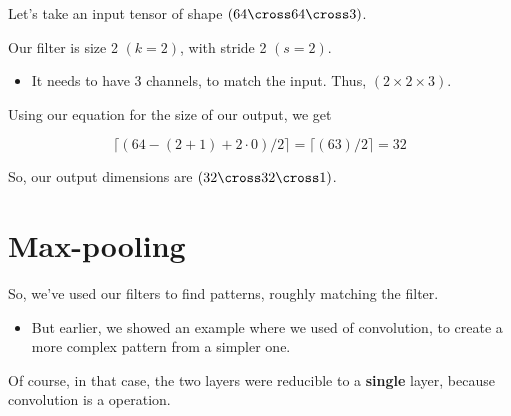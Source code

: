         \miniex Let's take an input tensor of shape $(64 \cross 64 \cross 3)$. 

        Our filter is size 2 $(k=2)$, with stride 2 $(s=2)$.

        \begin{itemize}
            \item It needs to have 3 channels, to match the input. Thus, $(2 \times 2 \times 3)$.
        \end{itemize}
        
        Using our equation for the size of our output, we get
        
        \begin{equation*}
            \lceil ( 64 - (2 + 1) + 2\cdot0 )/2 \rceil = \lceil ( 63 )/2 \rceil = 32
        \end{equation*}
        
        So, our output dimensions are $(32 \cross 32 \cross 1)$.
        
        


        

        

        
        

        


        

        

        

        

        

\pagebreak
\section{Max-pooling}

    So, we've used our filters to find  patterns, roughly matching the filter.

    \begin{itemize}
        \item But earlier, we showed an example where we used  of convolution, to create a more complex pattern from a simpler one.
    \end{itemize}

    Of course, in that case, the two layers were reducible to a \textbf{single} layer, because convolution is a  operation.

